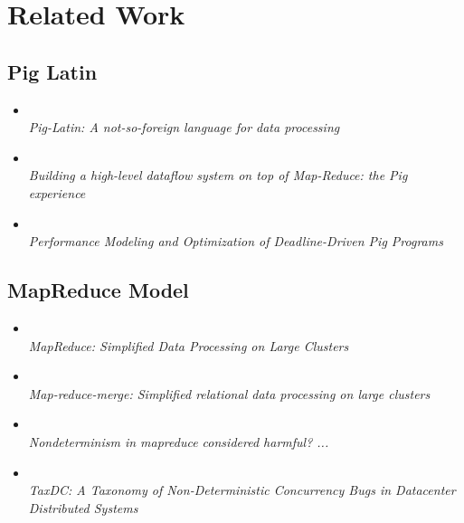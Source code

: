 \section*{Related Work}

\subsection{Pig Latin}
\begin{frame}
  \begin{itemize}
    \item \citet[SIGMOD][]{olston2008pig} \\
          \emph{Pig-Latin: A not-so-foreign language for data processing}
    \item \citet[VLDB][]{gates2009building} \\
          \emph{Building a high-level dataflow system on top of Map-Reduce: the
          Pig experience}
    \item \citet[TASS][]{zhang2013performance} \\
          \emph{Performance Modeling and Optimization of Deadline-Driven Pig
          Programs}
  \end{itemize}
\end{frame}

\subsection{MapReduce Model}
\begin{frame}
  \begin{itemize}
    \item \citet[CACM][]{dean2004mapreduce} \\
          \emph{MapReduce: Simplified Data Processing on Large Clusters}
    \item \citet[SIGMOD][]{yang2007map} \\
          \emph{Map-reduce-merge: Simplified relational data processing on large
          clusters}
    \item \citet[ICSE][]{xiao2014nondeterminism} \\
          \emph{Nondeterminism in mapreduce considered harmful? ...}
    \item \citet[ASPLOS][]{leesatapornwongsa2016taxdc} \\
          \emph{TaxDC: A Taxonomy of Non-Deterministic Concurrency Bugs in
          Datacenter Distributed Systems}
  \end{itemize}
\end{frame}

